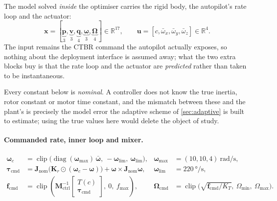 \documentclass[11pt,a4paper,twoside,openright]{report}
\newcommand{\R}{\mathbb{R}}
\newcommand{\diag}{\operatorname{diag}}
\newcommand{\clip}{\operatorname{clip}}
\renewcommand{\vec}[1]{\bm{#1}}
\newcommand{\mat}[1]{\bm{#1}}
\newcommand{\ctrlstate}{\vec{x}}
\newcommand{\inp}{\vec{u}}
\newcommand{\quat}{\vec{q}}
\newcommand{\bodyrate}{\vec{\omega}}
\theoremstyle{plain}
\theoremstyle{definition}
\theoremstyle{remark}
\begin{document}
	The model solved \emph{inside} the optimiser carries the rigid body, the
	autopilot's rate loop and the actuator:
	\begin{equation}
		\ctrlstate=[\underbrace{\vec p}_{3},\underbrace{\vec v}_{3},
		\underbrace{\quat}_{4},\underbrace{\bodyrate}_{3},
		\underbrace{\vec\Omega}_{4}]\in\R^{17},
		\qquad
		\inp=[c,\bar\omega_x,\bar\omega_y,\bar\omega_z]\in\R^{4}.
		\label{eq:ctrlstate}
	\end{equation}
	The input remains the CTBR command the autopilot actually exposes, so nothing
	about the deployment interface is assumed away; what the two extra blocks buy
	is that the rate loop and the actuator are \emph{predicted} rather than taken
	to be instantaneous.

	Every constant below is \emph{nominal}. A controller does not know the true
	inertia, rotor constant or motor time constant, and the mismatch between these
	and the plant's is precisely the model error the adaptive scheme of
	\cref{sec:adaptive} is built to estimate; using the true values here would
	delete the object of study.

	\paragraph{Commanded rate, inner loop and mixer.}
	\begin{align}
		\bodyrate_c &= \clip\!\big(\diag(\bodyrate_{\max})\,\bar{\bodyrate},\
		-\bodyrate_\mathrm{lim},\ \bodyrate_\mathrm{lim}\big),
		&\bodyrate_{\max}&=(10,10,4)\ \si{\radian\per\second},
		\label{eq:unpack}\\[2pt]
		\vec\tau_\mathrm{cmd} &= \mat J_\mathrm{nom}\big(\vec K_r\odot
		(\bodyrate_c-\bodyrate)\big)+\bodyrate\times\mat J_\mathrm{nom}\bodyrate,
		&\bodyrate_\mathrm{lim}&=\SI{220}{\degree\per\second},
		\label{eq:fc-inner}\\[2pt]
		\vec f_\mathrm{cmd} &= \clip\!\left(\mat M_\mathrm{ctrl}^{-1}
		\begin{bmatrix}T(c)\\ \vec\tau_\mathrm{cmd}\end{bmatrix},\ 0,\ f_{\max}\right),
		&\vec\Omega_\mathrm{cmd}&=\clip\!\big(\sqrt{\vec f_\mathrm{cmd}/K_T},\
		\Omega_{\min},\ \Omega_{\max}\big).
		\label{eq:fc-mixer}
	\end{align}
\end{document}
